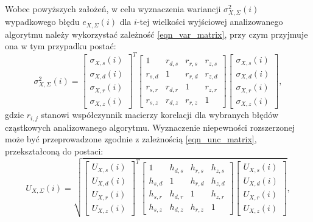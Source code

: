 Wobec powyższych założeń, w celu wyznaczenia wariancji $\sigma_{X,\Sigma}^{2}(i)$ wypadkowego błędu $e_{X,\Sigma}(i)$ dla $i$-tej wielkości wyjściowej analizowanego algorytmu należy wykorzystać zależność \eqref{eqn_var_matrix}, przy czym przyjmuje ona w tym przypadku postać:
\begin{equation}
\sigma_{X,\Sigma}^{2}(i) =
\begin{bmatrix}
\sigma_{X,s}(i) \\ \sigma_{X,d}(i) \\ \sigma_{X,r}(i) \\ \sigma_{X,z}(i)
\end{bmatrix}^{T}
\begin{bmatrix}
1         & r_{d,s} & r_{r,s} & r_{z,s} \\
r_{s,d}   & 1       & r_{r,d} & r_{z,d} \\
r_{s,r}   & r_{d,r} & 1       & r_{z,r} \\
r_{s,z}   & r_{d,z} & r_{r,z} & 1
\end{bmatrix}
\begin{bmatrix}
\sigma_{X,s}(i) \\ \sigma_{X,d}(i) \\ \sigma_{X,r}(i) \\ \sigma_{X,z}(i)
\end{bmatrix}
\label{eqn_alg_outvar_mat},
\end{equation}
gdzie $r_{i,j}$ stanowi współczynnik macierzy korelacji dla wybranych błędów cząstkowych analizowanego algorytmu. Wyznaczenie niepewności rozszerzonej może być przeprowadzone zgodnie z zależnością \eqref{eqn_unc_matrix}, przekształconą do postaci:
\begin{equation}
U_{X,\Sigma}(i) = \sqrt{
\begin{bmatrix}
U_{X,s}(i) \\ U_{X,d}(i) \\ U_{X,r}(i) \\ U_{X,z}(i)
\end{bmatrix}^{T}
\begin{bmatrix}
1         & h_{d,s} & h_{r,s} & h_{z,s} \\
h_{s,d}   & 1       & h_{r,d} & h_{z,d} \\
h_{s,r}   & h_{d,r} & 1       & h_{z,r} \\
h_{s,z}   & h_{d,z} & h_{r,z} & 1
\end{bmatrix}
\begin{bmatrix}
U_{X,s}(i) \\ U_{X,d}(i) \\ U_{X,r}(i) \\ U_{X,z}(i)
\end{bmatrix}}
\label{eqn_alg_outunc_mat},
\end{equation}
